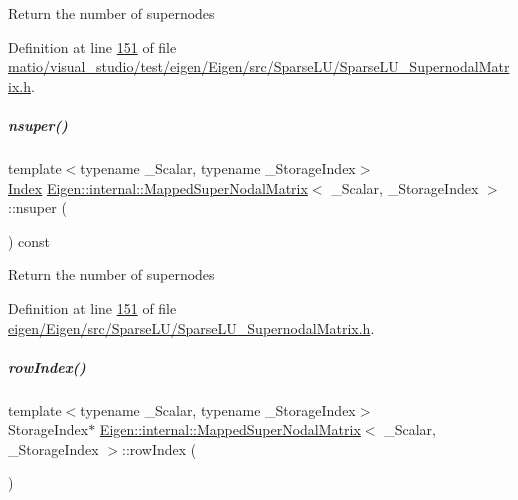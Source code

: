 Return the number of supernodes 

Definition at line \hyperlink{matio_2visual__studio_2test_2eigen_2_eigen_2src_2_sparse_l_u_2_sparse_l_u___supernodal_matrix_8h_source_l00151}{151} of file \hyperlink{matio_2visual__studio_2test_2eigen_2_eigen_2src_2_sparse_l_u_2_sparse_l_u___supernodal_matrix_8h_source}{matio/visual\+\_\+studio/test/eigen/\+Eigen/src/\+Sparse\+L\+U/\+Sparse\+L\+U\+\_\+\+Supernodal\+Matrix.\+h}.

\mbox{\label{group___sparse_l_u___module_a9c0b29102914a6ef9cfd6280fa016fa8}} 
\subparagraph{\texorpdfstring{nsuper()}{nsuper()}\hspace{0.1cm}{\footnotesize\ttfamily [2/2]}}
{\footnotesize\ttfamily template$<$typename \+\_\+\+Scalar, typename \+\_\+\+Storage\+Index$>$ \\
\hyperlink{namespace_eigen_a62e77e0933482dafde8fe197d9a2cfde}{Index} \hyperlink{group___sparse_l_u___module_class_eigen_1_1internal_1_1_mapped_super_nodal_matrix}{Eigen\+::internal\+::\+Mapped\+Super\+Nodal\+Matrix}$<$ \+\_\+\+Scalar, \+\_\+\+Storage\+Index $>$\+::nsuper (\begin{DoxyParamCaption}{ }\end{DoxyParamCaption}) const\hspace{0.3cm}{\ttfamily [inline]}}

Return the number of supernodes 

Definition at line \hyperlink{eigen_2_eigen_2src_2_sparse_l_u_2_sparse_l_u___supernodal_matrix_8h_source_l00151}{151} of file \hyperlink{eigen_2_eigen_2src_2_sparse_l_u_2_sparse_l_u___supernodal_matrix_8h_source}{eigen/\+Eigen/src/\+Sparse\+L\+U/\+Sparse\+L\+U\+\_\+\+Supernodal\+Matrix.\+h}.

\mbox{\label{group___sparse_l_u___module_a8e6b4f399aa468a10e58db627d43a12a}} 
\subparagraph{\texorpdfstring{row\+Index()}{rowIndex()}\hspace{0.1cm}{\footnotesize\ttfamily [1/2]}}
{\footnotesize\ttfamily template$<$typename \+\_\+\+Scalar, typename \+\_\+\+Storage\+Index$>$ \\
Storage\+Index$\ast$ \hyperlink{group___sparse_l_u___module_class_eigen_1_1internal_1_1_mapped_super_nodal_matrix}{Eigen\+::internal\+::\+Mapped\+Super\+Nodal\+Matrix}$<$ \+\_\+\+Scalar, \+\_\+\+Storage\+Index $>$\+::row\+Index (\begin{DoxyParamCaption}{ }\end{DoxyParamCaption})\hspace{0.3cm}{\ttfamily [inline]}}

